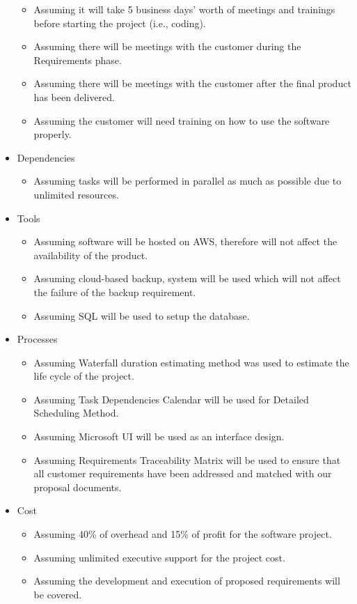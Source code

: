 \documentclass{article}
\begin{document}
\begin{itemize}
\begin{itemize}
  \item Assuming it will take 5 business days’ worth of meetings and trainings before starting the project (i.e., coding).
  \item Assuming there will be meetings with the customer during the Requirements phase.
  \item Assuming there will be meetings with the customer after the final product has been delivered. 
  \item Assuming the customer will need training on how to use the software properly.
  \end{itemize}
\item Dependencies
  \begin{itemize}
  \item Assuming tasks will be performed in parallel as much as possible due to unlimited resources.
  \end{itemize}
\item Tools
  \begin{itemize}
  \item Assuming software will be hosted on AWS, therefore will not affect the availability of the product.
  \item Assuming cloud-based backup, system will be used which will not affect the failure of the backup requirement.
  \item Assuming SQL will be used to setup the database.
  \end{itemize}
\item Processes
  \begin{itemize}
  \item Assuming Waterfall duration estimating method was used to estimate the life cycle of the project.
  \item Assuming Task Dependencies Calendar will be used for Detailed Scheduling Method.
  \item Assuming Microsoft UI will be used as an interface design.
  \item Assuming Requirements Traceability Matrix will be used to ensure that all customer requirements have been addressed and matched with our proposal documents.
  \end{itemize}
\item Cost
  \begin{itemize}
  \item Assuming 40\% of overhead and 15\% of profit for the software project. 
  \item Assuming unlimited executive support for the project cost.
  \item Assuming the development and execution of proposed requirements will be covered.

\end{itemize}
\end{itemize}
\end{document}
